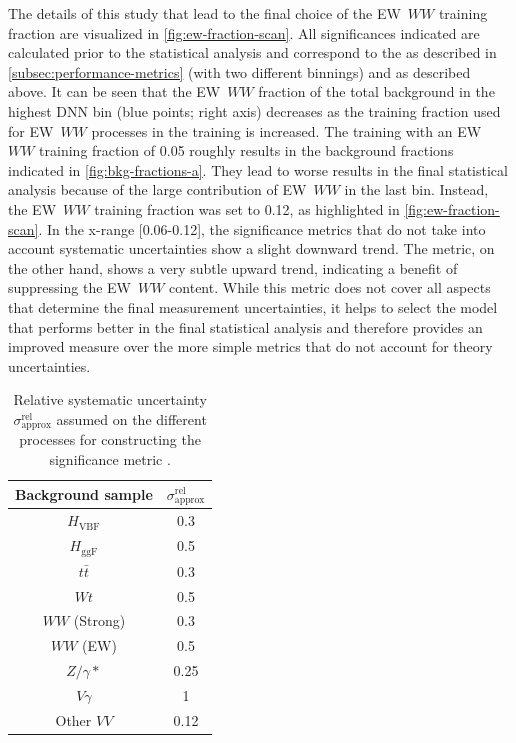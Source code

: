 The details of this study that lead to the final choice of the EW~$WW$ training fraction are visualized in \cref{fig:ew-fraction-scan}. All significances indicated are calculated prior to the statistical analysis and correspond to the \ZVBF as described in \cref{subsec:performance-metrics} (with two different binnings) and \ZVBFunc as described above. 
It can be seen that the EW~$WW$ fraction of the total background in the highest DNN bin (blue points; right axis) decreases as the training fraction used for EW~$WW$ processes in the training is increased.
The training with an EW~$WW$ training fraction of 0.05 roughly results in the background fractions indicated in \cref{fig:bkg-fractions-a}. 
They lead to worse results in the final statistical analysis because of the large contribution of EW~$WW$ in the last bin. 
Instead, the EW~$WW$ training fraction was set to 0.12, as highlighted in \cref{fig:ew-fraction-scan}.
In the x-range [0.06-0.12], the significance metrics that do not take into account systematic uncertainties show a slight downward trend. The \ZVBFunc metric, on the other hand, shows a very subtle upward trend, indicating a benefit of suppressing the EW~$WW$ content.
While this metric does not cover all aspects that determine the final measurement uncertainties, it helps to select the model that performs better in the final statistical analysis and therefore provides an improved measure over the more simple metrics that do not account for theory uncertainties.

\begin{table}[h]
    \centering
    \small
    \begin{tabular}{ c  | c}
        \toprule
        Background sample  & $\sigma^\text{rel}_\text{approx}$ \\
        \midrule
        $H_{\mathrm{VBF}}$ & 0.3                               \\
        $H_{\mathrm{ggF}}$ & 0.5                               \\
        $t\bar{t}$         & 0.3                               \\
        $Wt$               & 0.5                               \\
        $WW$ (Strong)      & 0.3                               \\
        $WW$ (EW)          & 0.5                               \\
        $Z/\gamma*$        & 0.25                              \\
        $V\gamma$          & 1                                 \\
        Other $VV$         & 0.12                              \\
        \bottomrule
    \end{tabular}
    \caption{Relative systematic uncertainty $\sigma^\text{rel}_\text{approx}$ assumed on the different processes for constructing the significance metric \ZVBFunc.}
    \label{tab:rough-uncertainties}
\end{table}

